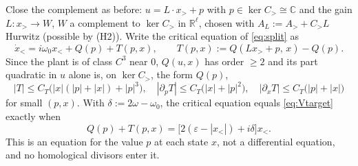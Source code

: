 \documentclass[11pt,reqno]{amsart}
\theoremstyle{plain}
\theoremstyle{definition}
\theoremstyle{remark}
\newcommand{\R}{\mathbb{R}}
\newcommand{\C}{\mathbb{C}}
\begin{document}
Close the complement as before: $u=L\cdot x_>+p$ with $p\in\ker C_>\cong\C$ and the gain $L\colon
x_>\to W$, $W$ a complement to $\ker C_>$ in $\R^{\ell}$, chosen with $A_L:=A_>+C_>L$ Hurwitz
(possible by (H2)). Write the critical equation of \eqref{eq:split} as
\begin{equation}\label{eq:crit-T}
  \dot x_<=i\omega_0x_<+Q(p)+T(p,x),\qquad T(p,x):=Q(L x_>+p,\,x)-Q(p).
\end{equation}
Since the plant is of class $C^3$ near $0$, $Q(u,x)$ has order $\ge2$ and its part quadratic in $u$ alone is, on $\ker C_>$, the form $Q(p)$,
\begin{equation}\label{eq:T-bounds}
  |T|\le C_T\bigl(|x|(|p|+|x|)+|p|^{3}\bigr),\quad
  |\partial_pT|\le C_T\bigl(|x|+|p|^{2}\bigr),\quad
  |\partial_{x}T|\le C_T\bigl(|p|+|x|\bigr)
\end{equation}
for small $(p,x)$. With $\delta:=2\omega-\omega_0$, the critical equation equals \eqref{eq:Vtarget}
exactly when
\begin{equation}\label{eq:pointwise}
  Q(p)+T(p,x)=\bigl[2(\varepsilon-|x_<|)+i\delta\bigr]x_< .
\end{equation}
This is an equation for the value $p$ at each state $x$, not a differential equation, and no
homological divisors enter it.
\end{document}
